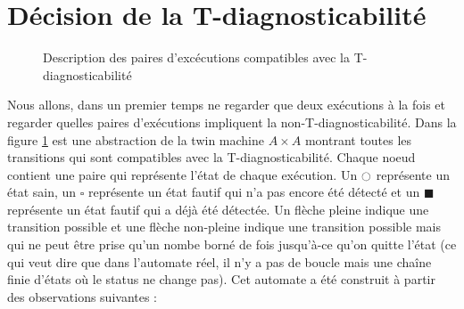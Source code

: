 \documentclass[10pt,a4paper]{article}
\newcommand{\es}{\square}
\newcommand{\fs}{\blacksquare}
\newcommand{\ec}{\ocircle}
\begin{document}
\section{Décision de la T-diagnosticabilité}
\begin{figure}
\caption{Description des paires d'excécutions compatibles avec la T-diagnosticabilité}
\label{a2diag}
\end{figure}
Nous allons, dans un premier temps ne regarder que deux exécutions à la fois et regarder quelles paires d'exécutions impliquent la non-T-diagnosticabilité. Dans la figure \ref{a2diag} est une abstraction de la twin machine $A\times A$ montrant toutes les transitions qui sont compatibles avec la T-diagnosticabilité. Chaque noeud contient une paire qui représente l'état de chaque exécution. Un $\ec$ représente un état sain, un $\es$ représente un état fautif qui n'a pas encore été détecté et un $\fs$ représente un état fautif qui a déjà été détectée. Un flèche pleine indique une transition possible et une flèche non-pleine indique une transition possible mais qui ne peut être prise qu'un nombe borné de fois jusqu'à-ce qu'on quitte l'état (ce qui veut dire que dans l'automate réel, il n'y a pas de boucle mais une chaîne finie d'états où le status ne change pas). Cet automate a été construit \`a partir des observations suivantes :
\end{document}

